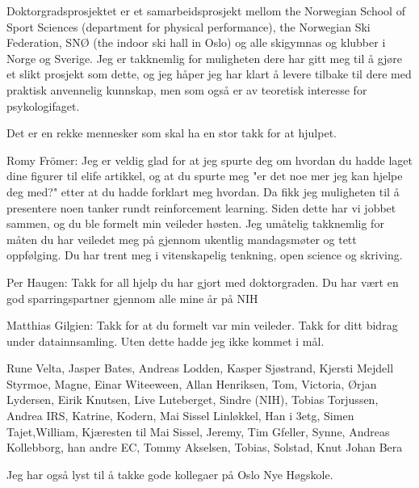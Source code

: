 
Doktorgradsprosjektet er et samarbeidsprosjekt mellom the Norwegian School of Sport Sciences (department for physical performance), the Norwegian Ski Federation, SNØ (the indoor ski hall in Oslo) og alle skigymnas og klubber i Norge og Sverige. Jeg er takknemlig for muligheten dere har gitt meg til å gjøre et slikt prosjekt som dette, og jeg håper jeg har klart å levere tilbake til dere med praktisk anvennelig kunnskap, men som også er av teoretisk interesse for psykologifaget. 

Det er en rekke mennesker som skal ha en stor takk for at hjulpet.

Romy Frömer: Jeg er veldig glad for at jeg spurte deg om hvordan du hadde laget dine figurer til elife artikkel, og at du spurte meg "er det noe mer jeg kan hjelpe deg med?" etter at du hadde forklart meg hvordan. Da fikk jeg muligheten til å presentere noen tanker rundt reinforcement learning. Siden dette har vi jobbet sammen, og du ble formelt min veileder høsten. Jeg umåtelig takknemlig for måten du har veiledet meg på gjennom ukentlig mandagsmøter og tett oppfølging. Du har trent meg i vitenskapelig tenkning, open science og skriving.  

Per Haugen: Takk for all hjelp du har gjort med doktorgraden. Du har vært en god sparringspartner gjennom alle mine år på NIH 

Matthias Gilgien: Takk for at du formelt var min veileder. Takk for ditt bidrag under datainnsamling. Uten dette hadde jeg ikke kommet i mål.


Rune Velta, Jasper Bates, Andreas Lodden, Kasper Sjøstrand, Kjersti Mejdell Styrmoe, Magne, Einar Witeeween, Allan Henriksen, Tom, Victoria, Ørjan Lydersen, Eirik Knutsen, Live Luteberget, Sindre (NIH), Tobias Torjussen, Andrea IRS, Katrine, Kodern, Mai Sissel Linløkkel, Han i 3etg, Simen Tajet,William, Kjæresten til Mai Sissel, Jeremy, Tim Gfeller, Synne, Andreas Kollebborg, han andre EC, Tommy Akselsen, Tobias, Solstad, Knut Johan Bera

Jeg har også lyst til å takke gode kollegaer på Oslo Nye Høgskole. 
